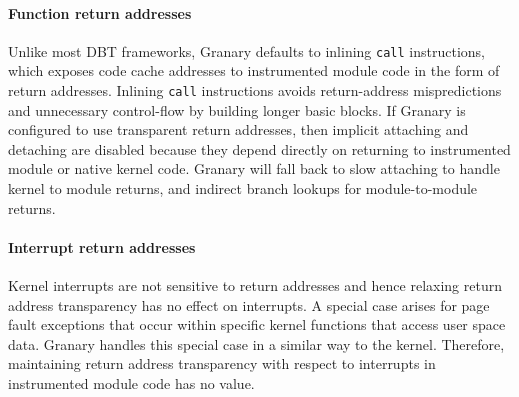 \documentclass[preprint]{sigplanconf}
\begin{document}


\paragraph{Function return addresses}\label{para:return_address_transparency} Unlike most DBT frameworks, Granary defaults to inlining \texttt{call} instructions, which exposes code cache addresses to instrumented module code in the form of return addresses. Inlining \texttt{call} instructions avoids return-address mispredictions and unnecessary control-flow by building longer basic blocks. If Granary is configured to use transparent return addresses, then implicit attaching and detaching are disabled because they depend directly on returning to instrumented module or native kernel code. Granary will fall back to slow attaching to handle kernel to module returns, and indirect branch lookups for module-to-module returns.

\paragraph{Interrupt return addresses} Kernel interrupts are not sensitive to return addresses and hence relaxing return address transparency has no effect on interrupts. A special case arises for page fault exceptions that occur within specific kernel functions that access user space data. Granary handles this special case in a similar way to the kernel. Therefore, maintaining return address transparency with respect to interrupts in instrumented module code has no value.
\end{document}
